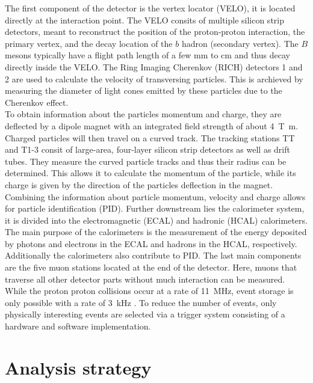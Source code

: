 The first component of the detector is the vertex locator (VELO), it is located directly at the interaction point. The VELO consits of multiple
silicon strip detectors, meant to reconstruct the position of the proton-proton interaction, the primary vertex, and the decay location of the $b$ hadron (secondary vertex).
The $B$ mesons typically have a flight path length of a few $\si{\milli\meter}$ to $\si{\centi\meter}$ and thus decay directly inside the VELO.
The Ring Imaging Cherenkov (RICH) detectors 1 and 2 are used to calculate the velocity of transversing particles. This is archieved by measuring the diameter of light cones emitted by these 
particles due to the Cherenkov effect. \\
To obtain information about the particles momentum and charge, they are deflected by a dipole magnet with an integrated field strength of about \qty{4}{\tesla\meter}. Charged particles
will then travel on a curved track. The tracking stations TT and T1-3 consit of large-area, four-layer silicon strip detectors as well as drift tubes. They measure the
curved particle tracks and thus their radius can be determined. This allows it to calculate the momentum of the particle, while its charge is given by the direction of the particles deflection
in the magnet. Combining the information about particle momentum, velocity and charge allows for particle identification (PID).
Further downstream lies the calorimeter system, it is divided into the electromagnetic (ECAL) and hadronic (HCAL) calorimeters.
The main purpose of the calorimeters is the measurement of the energy deposited by photons and electrons in the ECAL and hadrons in the HCAL, respectively.
Additionally the calorimeters also contribute to PID. The last main components are the five muon stations located at the end of the detector. Here, muons that traverse all other
detector parts without much interaction can be measured. \\
While the proton proton collisions occur at a rate of \qty{11}{\mega\hertz}, event storage is only possible with a rate of \qty{3}{\kilo\hertz} \cite{LHCbCPV}. To reduce the
number of events, only physically interesting events are selected via a trigger system consisting of a hardware and software implementation.

\section{Analysis strategy}

